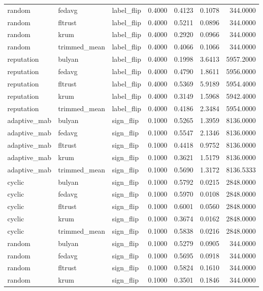 \begin{tabular}{lllrrrr}
random & fedavg & label_flip & 0.4000 & 0.4123 & 0.1078 & 344.0000 \\
random & fltrust & label_flip & 0.4000 & 0.5211 & 0.0896 & 344.0000 \\
random & krum & label_flip & 0.4000 & 0.2920 & 0.0966 & 344.0000 \\
random & trimmed_mean & label_flip & 0.4000 & 0.4066 & 0.1066 & 344.0000 \\
reputation & bulyan & label_flip & 0.4000 & 0.1998 & 3.6413 & 5957.2000 \\
reputation & fedavg & label_flip & 0.4000 & 0.4790 & 1.8611 & 5956.0000 \\
reputation & fltrust & label_flip & 0.4000 & 0.5369 & 5.9189 & 5954.4000 \\
reputation & krum & label_flip & 0.4000 & 0.3149 & 1.5968 & 5942.4000 \\
reputation & trimmed_mean & label_flip & 0.4000 & 0.4186 & 2.3484 & 5954.0000 \\
adaptive_mab & bulyan & sign_flip & 0.1000 & 0.5265 & 1.3959 & 8136.0000 \\
adaptive_mab & fedavg & sign_flip & 0.1000 & 0.5547 & 2.1346 & 8136.0000 \\
adaptive_mab & fltrust & sign_flip & 0.1000 & 0.4418 & 0.9752 & 8136.0000 \\
adaptive_mab & krum & sign_flip & 0.1000 & 0.3621 & 1.5179 & 8136.0000 \\
adaptive_mab & trimmed_mean & sign_flip & 0.1000 & 0.5690 & 1.3172 & 8136.5333 \\
cyclic & bulyan & sign_flip & 0.1000 & 0.5792 & 0.0215 & 2848.0000 \\
cyclic & fedavg & sign_flip & 0.1000 & 0.5970 & 0.0108 & 2848.0000 \\
cyclic & fltrust & sign_flip & 0.1000 & 0.6001 & 0.0560 & 2848.0000 \\
cyclic & krum & sign_flip & 0.1000 & 0.3674 & 0.0162 & 2848.0000 \\
cyclic & trimmed_mean & sign_flip & 0.1000 & 0.5838 & 0.0216 & 2848.0000 \\
random & bulyan & sign_flip & 0.1000 & 0.5279 & 0.0905 & 344.0000 \\
random & fedavg & sign_flip & 0.1000 & 0.5695 & 0.0918 & 344.0000 \\
random & fltrust & sign_flip & 0.1000 & 0.5824 & 0.1610 & 344.0000 \\
random & krum & sign_flip & 0.1000 & 0.3501 & 0.1846 & 344.0000 \\

\end{tabular}
